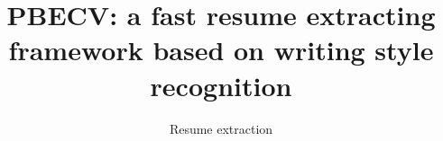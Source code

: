 \documentclass{acm_proc_article-sp}
\begin{document}
\title{PBECV: a fast resume extracting framework based on writing style recognition}
\subtitle{Resume extraction}
\textit{}

%
%
%
%
%

%
%
%
\end{document}
